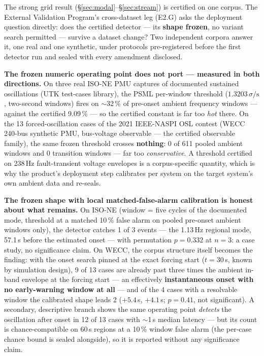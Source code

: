 \documentclass[11pt]{article}
\begin{document}
The strong grid result (\S\ref{sec:modal}--\S\ref{sec:stream}) is
certified on one corpus. The External Validation Program's cross-dataset
leg (E2.G) asks the deployment question directly: does the certified
detector --- its \textbf{shape frozen}, no variant search permitted ---
survive a dataset change? Two independent corpora answer it, one real
and one synthetic, under protocols pre-registered before the first
detector run and sealed with every amendment disclosed.

\textbf{The frozen numeric operating point does not port --- measured in
both directions.} On three real ISO-NE PMU captures of documented
sustained oscillations (UTK test-cases library), the PSML per-window
threshold ($1.3203\,\sigma/\mathrm{s}$, two-second windows) fires on
$\sim$32\,\% of pre-onset ambient frequency windows --- against the
certified 9.09\,\% --- so the certified constant is far too \emph{hot}
there. On the 13 forced-oscillation cases of the 2021 IEEE-NASPI OSL
contest (WECC 240-bus synthetic PMU, bus-voltage observable --- the
certified observable family), the same frozen threshold crosses
\textbf{nothing}: 0 of 611 pooled ambient windows and 0 transition
windows --- far too \emph{conservative}. A threshold certified on
238\,Hz fault-transient voltage envelopes is a corpus-specific quantity,
which is why the product's deployment step calibrates per system on the
target system's own ambient data and re-seals.

\textbf{The frozen shape with local matched-false-alarm calibration is
honest about what remains.} On ISO-NE (window = five cycles of the
documented mode, threshold at a matched 10\,\% false alarm on pooled
pre-onset ambient windows only), the detector catches 1 of 3 events ---
the 1.13\,Hz regional mode, 57.1\,s before the estimated onset --- with
permutation $p = 0.332$ at $n = 3$: a case study, no significance claim.
On WECC, the corpus structure itself becomes the finding: with the onset
search pinned at the exact forcing start ($t = 30$\,s, known by
simulation design), 9 of 13 cases are already past three times the
ambient in-band envelope at the forcing start --- an effectively
\textbf{instantaneous onset with no early-warning window at all} --- and
of the 4 cases with a resolvable window the calibrated shape leads 2
($+5.4$\,s, $+4.1$\,s; $p = 0.41$, not significant). A secondary,
descriptive branch shows the same operating point \emph{detects} the
oscillation after onset in 12 of 13 cases with $\sim$1\,s median latency
--- but its count is chance-compatible on 60\,s regions at a 10\,\%
window false alarm (the per-case chance bound is sealed alongside), so
it is reported without any significance claim.
\end{document}
